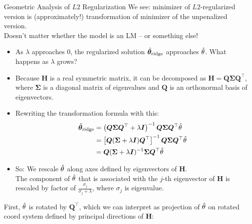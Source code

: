 \documentclass[11pt,compress,t,notes=noshow, xcolor=table]{beamer}
\begin{document}
\begin{vbframe}{Geometric Analysis of $L2$ Regularization}
We see: minimizer of $L2$-regularized version is (approximately!) transformation of minimizer of the unpenalized version.\\
Doesn't matter whether the model is an LM -- or something else!
\vspace{0.2cm}



\framebreak

  \begin{itemize}
    \item As $\lambda$ approaches $0$, the regularized solution $\hat{\bm{\theta}}_{\text{ridge}}$ approaches $\hat{\theta}$. What happens as $\lambda$ grows?
    \item Because $\bm{H}$ is a real symmetric matrix, it can be decomposed as $\bm{H} = \bm{Q} \bm{\Sigma} \bm{Q}^\top$, where $\bm{\Sigma}$ is a diagonal matrix of eigenvalues and $\bm{Q}$ is an orthonormal basis of eigenvectors.
    \item Rewriting the transformation formula with this:
  \begin{equation*}
    \begin{aligned} 
    \hat{\bm{\theta}}_{\text{ridge}} &=\left(\bm{Q} \bm{\Sigma} \bm{Q}^{\top}+\lambda \bm{I}\right)^{-1} \bm{Q} \bm{\Sigma} \bm{Q}^{\top} \hat{\theta} \\ 
              &=\left[\bm{Q}(\bm{\Sigma}+\lambda \bm{I}) \bm{Q}^{\top}\right]^{-1} \bm{Q} \bm{\Sigma} \bm{Q}^{\top} \hat{\theta} \\ 
              &=\bm{Q}(\bm{\Sigma} + \lambda \bm{I})^{-1} \bm{\Sigma} \bm{Q}^{\top} \hat{\theta} 
    \end{aligned}
  \end{equation*}
    \item So: We rescale $\hat{\theta}$ along axes defined by eigenvectors of $\bm{H}$. \\
    The component of $\hat{\theta}$ that is associated with the $j$-th eigenvector of $\bm{H}$ is rescaled by factor of $\frac{\sigma_j}{\sigma_j + \lambda}$, where $\sigma_j$ is eigenvalue.
\end{itemize}

\framebreak

First, $\hat{\theta}$ is rotated by $\bm{Q}^{\top}$, which we can interpret as projection of $\hat{\theta}$ on rotated coord system defined by principal directions of $\bm{H}$:


\end{vbframe}
\end{document}
